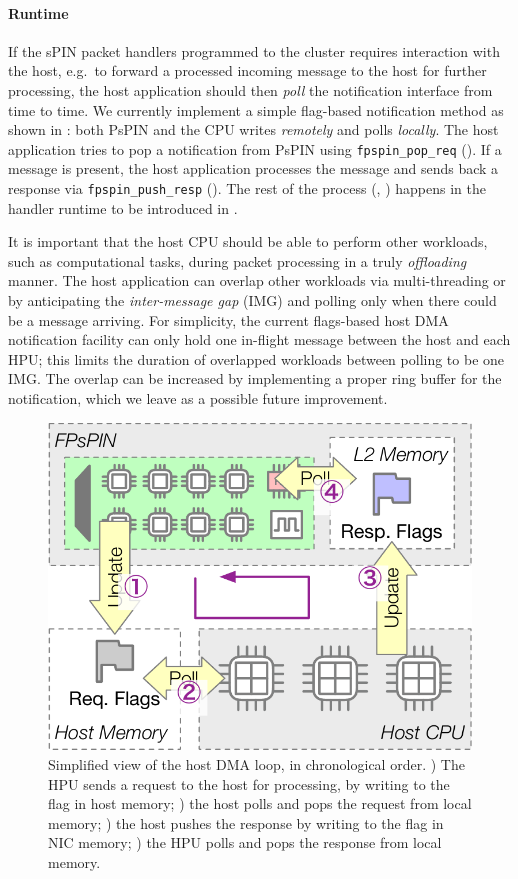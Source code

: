 \paragraph{Runtime} If the sPIN packet handlers programmed to the cluster requires interaction with the host, e.g.\ to forward a processed incoming message to the host for further processing, the host application should then \emph{poll} the notification interface from time to time.  We currently implement a simple flag-based notification method as shown in : both PsPIN and the CPU writes \emph{remotely} and polls \emph{locally}.  The host application tries to pop a notification from PsPIN using \texttt{fpspin\_\-pop\_\-req} ().  If a message is present, the host application processes the message and sends back a response via \texttt{fpspin\_\-push\_\-resp} ().  The rest of the process (, ) happens in the handler runtime to be introduced in .

It is important that the host CPU should be able to perform other workloads, such as computational tasks, during packet processing in a truly \emph{offloading} manner.  The host application can overlap other workloads via multi-threading or by anticipating the \emph{inter-message gap} (IMG) and polling only when there could be a message arriving.  For simplicity, the current flags-based host DMA notification facility can only hold one in-flight message between the host and each HPU; this limits the duration of overlapped workloads between polling to be one IMG.  The overlap can be increased by implementing a proper ring buffer for the notification, which we leave as a possible future improvement.

\begin{figure}[tp]
    \centering
    \includegraphics[width=.5\textwidth]{thesis/figures/host-dma-req-resp.pdf}
    \caption[Simplified view of the host DMA loop]{Simplified view of the host DMA loop, in chronological order.  ) The HPU sends a request to the host for processing, by writing to the flag in host memory; ) the host polls and pops the request from local memory; ) the host pushes the response by writing to the flag in NIC memory; ) the HPU polls and pops the response from local memory.} \label{fig:host-dma-req-resp}
\end{figure}

